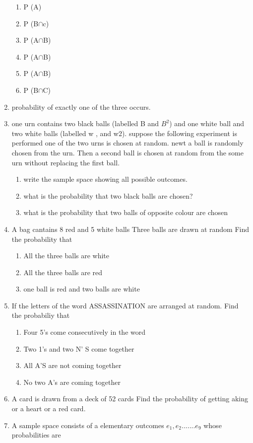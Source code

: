 \documentclass[12pt]{article}
\begin{document}
\begin{enumerate}
\begin{enumerate}
\item P (A)
\item P (B$\cap$c)
\item P (A$\cap$B)
\item P (A$\cap$B)
\item P (A$\cap$B)
\item P (B$\cap$C)
\end{enumerate}
\item probability of exactly one of the three occurs.
\item one urn contains two black balls (labelled B and $B^2$) and one white ball and two white balls (labelled w , and w2). suppose the  following experiment is performed one of the two urns is chosen at random. newt a ball is randomly chosen from the urn. Then a second ball is chosen at random from the some urn without replacing the first ball.
	\begin{enumerate}
\item write the sample space showing all possible outcomes.
\item what is the probability that two black balls are chosen?
\item what is the probability that two balls of opposite colour are chosen
	\end{enumerate}
\item A bag cantains 8 red and 5 white balls Three balls are drawn at random Find the probability that 
\begin{enumerate}
\item All the three balls are white
\item All the three balls are red
\item one ball is red and two balls are white
	\end{enumerate}
\item If the letters of the word ASSASSINATION are arranged at  random. Find the probabiliy that
\begin{enumerate}
\item Four 5's come consecutively in the word
\item Two 1's and two N' S  come together
\item All A'S are not coming together
\item No two A's are coming together
	\end{enumerate}
\item A card is drawn from a deck of 52 cards Find the probability of getting aking or a heart or a red card.
\item A sample space consists of a elementary outcomes $e_1,e_2.......e_9$ whose probabilities are 

\end{enumerate}
\end{document}
